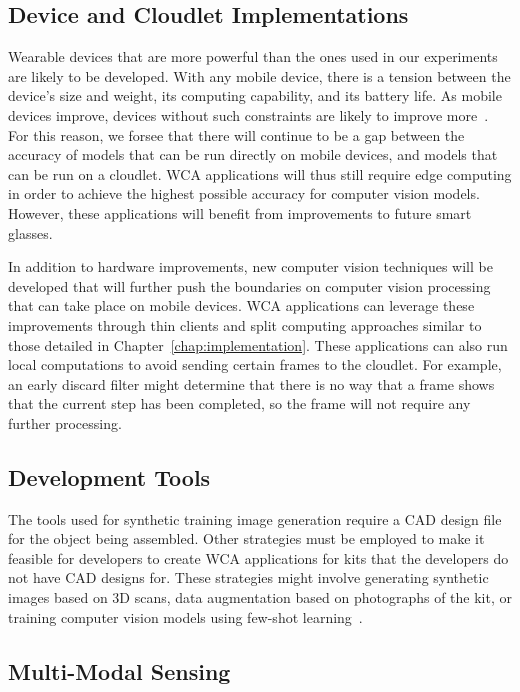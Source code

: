 \subsection{Device and Cloudlet Implementations}

Wearable devices that are more powerful than the ones used in our experiments
are likely to be developed.
With any mobile device, there is a tension between the device's size and
weight, its computing capability, and its battery life.
As mobile devices improve, devices without such constraints are likely to
improve more~\cite{Satya2021}.
For this reason, we forsee that there will continue to be a gap between the
accuracy of models that can be run directly on mobile devices, and models that
can be run on a cloudlet.
WCA applications will thus still require edge computing in order to achieve the
highest possible accuracy for computer vision models.
However, these applications will benefit from improvements to future smart
glasses.

In addition to hardware improvements, new computer vision techniques will be
developed that will further push the boundaries on computer vision processing
that can take place on mobile devices.
WCA applications can leverage these improvements through thin clients and split
computing approaches similar to those detailed in
Chapter~\ref{chap:implementation}.
These applications can also run local computations to avoid sending certain
frames to the cloudlet.
For example, an early discard filter might determine that there is no way that a
frame shows that the current step has been completed, so the frame will not
require any further processing.

\subsection{Development Tools}

The tools used for synthetic training image generation require a CAD design file
for the object being assembled.
Other strategies must be employed to make it feasible for developers to create
WCA applications for kits that the developers do not have CAD designs for.
These strategies might involve generating synthetic images based on 3D scans,
data augmentation based on photographs of the kit, or training computer vision
models using few-shot learning~\cite{fewshot}.

\subsection{Multi-Modal Sensing}

